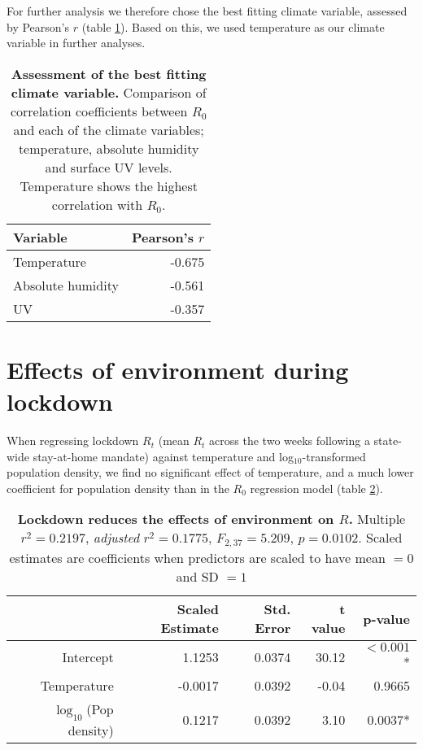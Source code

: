\documentclass[12pt,english,a4paper]{article}
\newcommand{\RO}{$R_0$\xspace}
\begin{document}
For further analysis we therefore chose the best fitting climate variable, assessed by Pearson's $r$ (table \ref{tab:climate_selection}). Based on this, we used temperature as our climate variable in further analyses.

\begin{table}[ht]
\centering
\caption{\textbf{Assessment of the best fitting climate variable.} Comparison of correlation coefficients between \RO and each of the climate variables; temperature, absolute humidity and surface UV levels. Temperature shows the highest correlation with \RO.}
\begin{tabular}{lr}
  \hline
  Variable & Pearson's $r$  \\ 
  \hline
  Temperature & -0.675 \\
  Absolute humidity & -0.561 \\
  UV & -0.357 \\
  \hline
\end{tabular}
\label{tab:climate_selection}
\end{table}


\section{Effects of environment during lockdown}

When regressing lockdown $R_t$ (mean $R_t$ across the two weeks following a state-wide stay-at-home mandate) against temperature and log$_{10}$-transformed population density, we find no significant effect of temperature, and a much lower coefficient for population density than in the \RO regression model (table \ref{tab:lockdown_model}).

\begin{table}[ht]
\centering
\caption{{\bf Lockdown reduces the effects of environment on $R$.} Multiple $r^2 = 0.2197$, \textsl{adjusted} $r^2 = 0.1775$, $F_{2,37} = 5.209$, $p = 0.0102$. Scaled estimates are coefficients when predictors are scaled to have mean $= 0$ and SD $= 1$}
\begin{tabular}{rrrrr}
  \hline
  & Scaled Estimate & Std. Error & t value & p-value \\ 
  \hline
  Intercept & 1.1253 & 0.0374 & 30.12 & $< 0.001$* \\ 
  Temperature & -0.0017 & 0.0392 & -0.04 & 0.9665 \\ 
  $\log_{10}$(Pop density) & 0.1217 & 0.0392 & 3.10 & 0.0037* \\ 
   \hline
\end{tabular}
\label{tab:lockdown_model}
\end{table}
\end{document}

